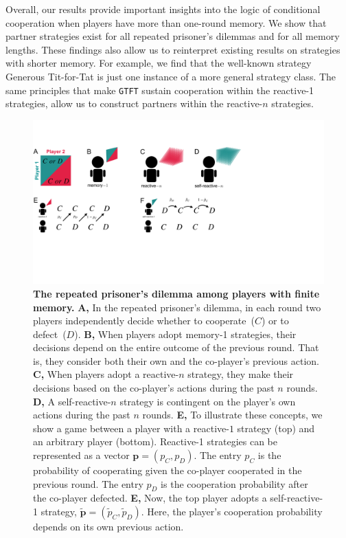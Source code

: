 \documentclass[9pt,twocolumn,twoside]{pnas-new}
\def\gtft{\texttt{GTFT}}
\begin{document}
Overall, our results provide important insights into the logic of conditional cooperation when players have more than one-round memory. 
We show that partner strategies exist for all repeated prisoner's dilemmas and for all memory lengths. 
These findings also allow us to reinterpret existing results on strategies with shorter memory. 
For example, we find that the well-known strategy Generous Tit-for-Tat \citep[\gtft, see Ref.][]{nowak:Nature:1992,molander:jcr:1985} is just one instance of a more general strategy class. 
The same principles that make \gtft{} sustain cooperation within the reactive-1 strategies, allow us to construct partners within the reactive-$n$ strategies. 

\begin{figure}[h]
       \centering
       \includegraphics[width=.95\textwidth]{../../figures/conceptual_figure.pdf}
       \caption{\textbf{The repeated prisoner's dilemma among players with finite memory.}
       \textbf{A,} In the repeated prisoner's dilemma, in each round two players independently decide whether to cooperate~($C$) or to defect~($D$). 
       \textbf{B,} When players adopt memory-1 strategies, their decisions depend on the entire outcome of the previous round. That is, they consider both their own and the co-player's previous action. 
       \textbf{C,} When players adopt a reactive-$n$ strategy, they make their decisions based on the co-player's actions during the past $n$ rounds. 
       \textbf{D,} A self-reactive-$n$ strategy is contingent on the player's own actions during the past $n$ rounds. 
       \textbf{E,} To illustrate these concepts, we show a game between a player with a reactive-$1$ strategy (top) and an arbitrary player (bottom). 
       Reactive-1 strategies can be represented as a vector  $\mathbf{p} \!=\! (p_C, p_D)$. 
       The entry $p_C$ is the probability of cooperating given the co-player cooperated in the previous round.
       The entry $p_D$ is the cooperation probability after the co-player defected. 
       \textbf{E,} Now, the top player adopts a self-reactive-1 strategy, $\mathbf{\tilde p}\!=\!(\tilde p_C, \tilde p_D)$. 
       Here, the player's cooperation probability depends on its own previous action.
       }\label{fig:conceptual_figure_model}
\end{figure}
\end{document}
